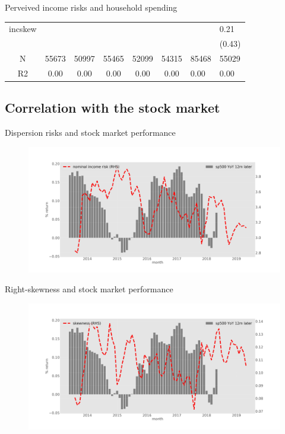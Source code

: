 \documentclass{beamer}
\begin{document}
\begin{frame}{Perveived income risks and household spending}
\begin{table}
{\begin{tabular}{ccccccll}
		incskew   &            &             &              &               &                &                 &             0.21 \\
		&            &             &              &               &                &                 &           (0.43) \\
		\hline 
		N         &      55673 &       50997 &        55465 &         52099 &          54315 &           85468 &            55029 \\
		R2        &       0.00 &        0.00 &         0.00 &          0.00 &           0.00 &            0.00 &             0.00 \\
		\hline 
	\end{tabular}
		}
	\end{table}
\end{frame}


\subsection{Correlation with the stock market}


\begin{frame}{Dispersion risks and stock market performance}
	\begin{figure}
		\centering
		\label{ts_var}
		\includegraphics[width=\textwidth]{figures/tsMean3mvvar.jpg}
	\end{figure}
\end{frame}


\begin{frame}{Right-skewness and stock market performance}
	\begin{figure}
		\centering 
		\label{ts_skew}
		\includegraphics[width=\textwidth]{figures/tsMean3mvskew.jpg}
	\end{figure}
\end{frame}
\end{document}
